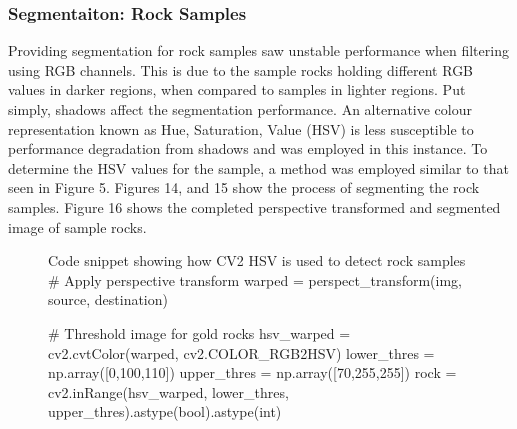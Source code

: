 \documentclass[a4paper]{article}
\begin{document}
\clearpage

\subsubsection{Segmentaiton: Rock Samples}

Providing segmentation for rock samples saw unstable performance when filtering using RGB channels. This is due to the sample rocks holding different RGB values in darker regions, when compared to samples in lighter regions. Put simply, shadows affect the segmentation performance. An alternative colour representation known as Hue, Saturation, Value (HSV) is less susceptible to performance degradation from shadows and was employed in this instance. To determine the HSV values for the sample, a method was employed similar to that seen in Figure 5. Figures 14, and 15 show the process of segmenting the rock samples. Figure 16 shows the completed perspective transformed and segmented image of sample rocks.

\vspace{1cm}

\begin{figure}[h]\scriptsize
\centering
\begin{sexylisting}{Code snippet showing how CV2 HSV is used to detect rock samples}
# Apply perspective transform
warped = perspect_transform(img, source, destination)

# Threshold image for gold rocks
hsv_warped = cv2.cvtColor(warped, cv2.COLOR_RGB2HSV)
lower_thres = np.array([0,100,110])
upper_thres = np.array([70,255,255])
rock = cv2.inRange(hsv_warped, lower_thres, upper_thres).astype(bool).astype(int)
\end{sexylisting}
\end{figure}

\vspace{-0.5cm}
\end{document}
